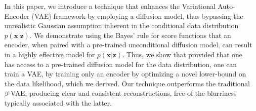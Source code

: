 In this paper, we introduce a technique that enhances the Variational Auto-Encoder (VAE) framework by employing a diffusion model, thus bypassing the unrealistic Gaussian assumption inherent in the conditional data distribution $p(\textbf{x} | \textbf{z})$. We demonstrate using the Bayes' rule for score functions that an encoder, when paired with a pre-trained unconditional diffusion model, can result in a highly effective model for $p(\textbf{x}| \textbf{z})$. Thus, we show that  provided that one has access to a pre-trained diffusion model for the data distribution, one can train a VAE, by training only an encoder by optimizing a novel lower-bound on the data likelihood, which we derived. Our technique outperforms the traditional $\beta$-VAE, producing clear and consistent reconstructions, free of the blurriness typically associated with the latter.
